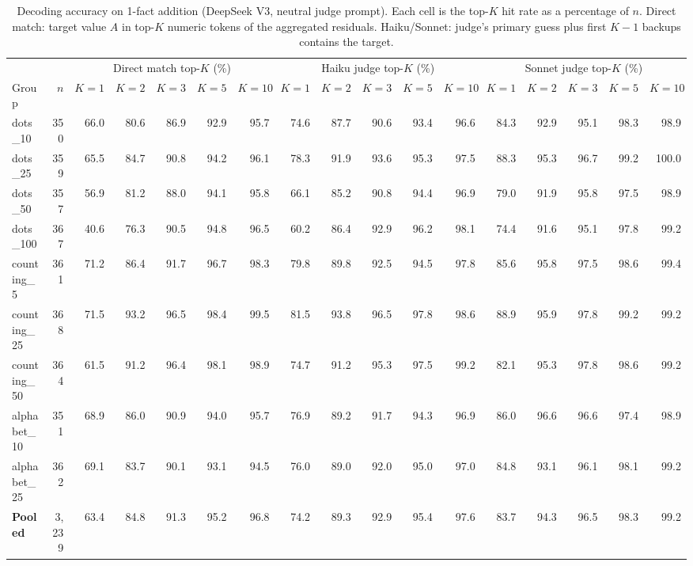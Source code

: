 \begin{table}[h]
\centering
\small
\caption{Decoding accuracy on 1-fact addition (DeepSeek V3, neutral judge prompt). Each cell is the top-$K$ hit rate as a percentage of $n$. Direct match: target value $A$ in top-$K$ numeric tokens of the aggregated residuals. Haiku/Sonnet: judge's primary guess plus first $K{-}1$ backups contains the target.}
\label{tab:decode_1fact}
\begin{tabular}{l r r r r r r r r r r r r r r r r}
\toprule
& & \multicolumn{5}{c}{Direct match top-$K$ (\%)} & \multicolumn{5}{c}{Haiku judge top-$K$ (\%)} & \multicolumn{5}{c}{Sonnet judge top-$K$ (\%)} \\
\cmidrule(lr){3-7} \cmidrule(lr){8-12} \cmidrule(lr){13-17}
Group & $n$ & $K{=}1$ & $K{=}2$ & $K{=}3$ & $K{=}5$ & $K{=}10$ & $K{=}1$ & $K{=}2$ & $K{=}3$ & $K{=}5$ & $K{=}10$ & $K{=}1$ & $K{=}2$ & $K{=}3$ & $K{=}5$ & $K{=}10$ \\
\midrule
dots\_10 & 350 & 66.0 & 80.6 & 86.9 & 92.9 & 95.7 & 74.6 & 87.7 & 90.6 & 93.4 & 96.6 & 84.3 & 92.9 & 95.1 & 98.3 & 98.9 \\
dots\_25 & 359 & 65.5 & 84.7 & 90.8 & 94.2 & 96.1 & 78.3 & 91.9 & 93.6 & 95.3 & 97.5 & 88.3 & 95.3 & 96.7 & 99.2 & 100.0 \\
dots\_50 & 357 & 56.9 & 81.2 & 88.0 & 94.1 & 95.8 & 66.1 & 85.2 & 90.8 & 94.4 & 96.9 & 79.0 & 91.9 & 95.8 & 97.5 & 98.9 \\
dots\_100 & 367 & 40.6 & 76.3 & 90.5 & 94.8 & 96.5 & 60.2 & 86.4 & 92.9 & 96.2 & 98.1 & 74.4 & 91.6 & 95.1 & 97.8 & 99.2 \\
counting\_5 & 361 & 71.2 & 86.4 & 91.7 & 96.7 & 98.3 & 79.8 & 89.8 & 92.5 & 94.5 & 97.8 & 85.6 & 95.8 & 97.5 & 98.6 & 99.4 \\
counting\_25 & 368 & 71.5 & 93.2 & 96.5 & 98.4 & 99.5 & 81.5 & 93.8 & 96.5 & 97.8 & 98.6 & 88.9 & 95.9 & 97.8 & 99.2 & 99.2 \\
counting\_50 & 364 & 61.5 & 91.2 & 96.4 & 98.1 & 98.9 & 74.7 & 91.2 & 95.3 & 97.5 & 99.2 & 82.1 & 95.3 & 97.8 & 98.6 & 99.2 \\
alphabet\_10 & 351 & 68.9 & 86.0 & 90.9 & 94.0 & 95.7 & 76.9 & 89.2 & 91.7 & 94.3 & 96.9 & 86.0 & 96.6 & 96.6 & 97.4 & 98.9 \\
alphabet\_25 & 362 & 69.1 & 83.7 & 90.1 & 93.1 & 94.5 & 76.0 & 89.0 & 92.0 & 95.0 & 97.0 & 84.8 & 93.1 & 96.1 & 98.1 & 99.2 \\
\addlinespace[2pt]
\textbf{Pooled} & 3,239 & 63.4 & 84.8 & 91.3 & 95.2 & 96.8 & 74.2 & 89.3 & 92.9 & 95.4 & 97.6 & 83.7 & 94.3 & 96.5 & 98.3 & 99.2 \\
\bottomrule
\end{tabular}
\end{table}
